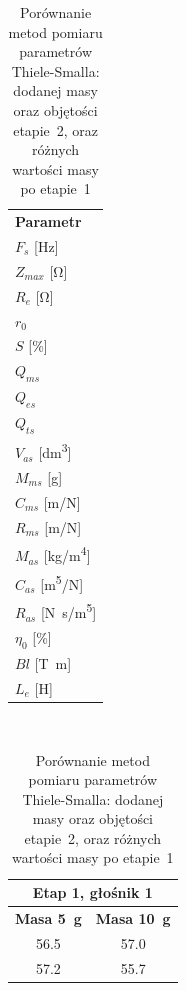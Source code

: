 \documentclass[12pt]{oska}
\begin{document}
	\begin{table}[!ht]
		\centering
		\caption{Porównanie metod pomiaru parametrów Thiele-Smalla: dodanej masy oraz objętości etapie~2, oraz różnych wartości masy po etapie~1}
		\label{t:TS_metody}
		\boldmath
		\begin{tabular}{|l|}
			\hline
			\multirow{2}{*}{\textbf{Parametr}} 	\\
			\\\hline
			\hline                              							
			$F_s$ [\si{\hertz}] \\\hline
			$Z_{max}$ [\si{\ohm}] \\\hline
			$R_e$ [\si{\ohm}] \\\hline
			$r_0$ \\\hline
			$S$ [\%]\\\hline
			\hline                              							
			$Q_{ms}$ 	\\\hline
			$Q_{es}$ \\\hline	
			$Q_{ts}$ \\\hline
			\hline                                                  		
			$V_{as}$ [\si{\deci\metre\cubed}] \\\hline
			$M_{ms}$ [\si{\gram}] 	\\\hline
			$C_{ms}$ [\si[per-mode=symbol]{\metre\per\newton}] 	\\\hline
			$R_{ms}$ [\si[per-mode=symbol]{\metre\per\newton}] 	\\\hline
			\hline
			$M_{as}$ [\si[per-mode=symbol]{\kilo\gram\per\metre\tothe{4}}] 	\\\hline
			$C_{as}$ [\si[per-mode=symbol]{\metre\tothe{5}\per\newton}] \\\hline	
			$R_{as}$ [\si[per-mode=symbol]{\newton\s\per\metre\tothe{5}}] 	\\\hline
			\hline
			$\eta_0$ [\%] 	\\\hline
			$Bl$ [\si{\tesla\metre}]	\\\hline
			$L_{e}$ [\si{\henry}] 	\\\hline
		\end{tabular}
		\unboldmath
		~ \quad
		\begin{tabular}{|c|c|}
			\hline
			\multicolumn{2}{|c|}{\textbf{Etap 1, głośnik 1}} \\\hline
			\textbf{Masa \SI{5}{\gram}} & \textbf{Masa \SI{10}{\gram}} \\\hline
			\hline
			\num{56,5} 	& \num{57,0} 	 \\\hline
			\num{57,2} 	& \num{55,7} 	 \\\hline

\end{tabular}
\end{table}
\end{document}
